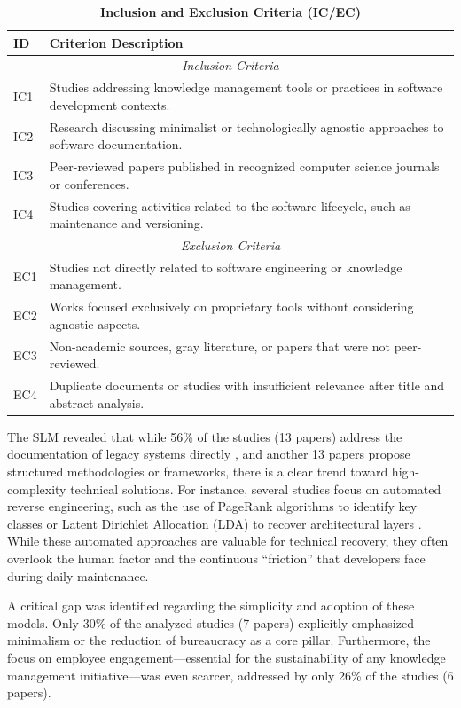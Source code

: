 \documentclass{ieeeaccess}
\begin{document}
\begin{table}
\caption{\textbf{Inclusion and Exclusion Criteria (IC/EC)}}
\label{table_criteria}
\setlength{\tabcolsep}{3pt}
\begin{tabular}{|p{25pt}|p{206pt}|}
\hline
ID & Criterion Description \\
\hline
\multicolumn{2}{|c|}{\textit{Inclusion Criteria}} \\
\hline
IC1 & Studies addressing knowledge management tools or practices in software development contexts. \\
IC2 & Research discussing minimalist or technologically agnostic approaches to software documentation. \\
IC3 & Peer-reviewed papers published in recognized computer science journals or conferences. \\
IC4 & Studies covering activities related to the software lifecycle, such as maintenance and versioning. \\
\hline
\multicolumn{2}{|c|}{\textit{Exclusion Criteria}} \\
\hline
EC1 & Studies not directly related to software engineering or knowledge management. \\
EC2 & Works focused exclusively on proprietary tools without considering agnostic aspects. \\
EC3 & Non-academic sources, gray literature, or papers that were not peer-reviewed. \\
EC4 & Duplicate documents or studies with insufficient relevance after title and abstract analysis. \\
\hline
\end{tabular}
\end{table}

The SLM revealed that while 56\% of the studies (13 papers) address the documentation of legacy systems directly \cite{garousi}, and another 13 papers propose structured methodologies or frameworks, there is a clear trend toward high-complexity technical solutions. For instance, several studies focus on automated reverse engineering, such as the use of PageRank algorithms to identify key classes \cite{e02} or Latent Dirichlet Allocation (LDA) to recover architectural layers \cite{e03}. While these automated approaches are valuable for technical recovery, they often overlook the human factor and the continuous ``friction'' that developers face during daily maintenance.

A critical gap was identified regarding the simplicity and adoption of these models. Only 30\% of the analyzed studies (7 papers) explicitly emphasized minimalism or the reduction of bureaucracy as a core pillar. Furthermore, the focus on employee engagement—essential for the sustainability of any knowledge management initiative—was even scarcer, addressed by only 26\% of the studies (6 papers).
\end{document}
